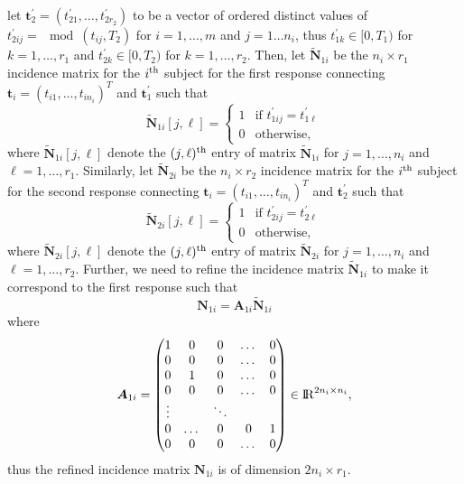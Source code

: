\documentclass[article,lineno]{biometrika}
\begin{document}
 let 
 $
\boldsymbol t_2^\prime = (t_{21}^\prime, \dots, t_{2r_2}^\prime)
 $
 to be a vector of ordered distinct values of $t_{2ij}^\prime =\mod{(t_{ij}, T_2)}$ for $i = 1, \dots, m$ and $j = 1\dots n_i$, 
 thus $t_{1k}^\prime \in [0, T_1)$ for $k = 1, \dots, r_1$ and
  $t_{2k}^\prime \in [0, T_2)$ for $k = 1, \dots, r_2$.
Then, let 
 $\boldsymbol {\tilde N}_{1i}$ be the $n_i \times r_1$ incidence matrix for the $i^{\rm th}$ subject 
 for the first response connecting 
 $
 \boldsymbol t_i = (t_{i1}, \dots, t_{in_i})^T 
 $
 and
 $\boldsymbol t^\prime_1$ such that
 $$
\boldsymbol {\tilde N}_{1i} [j, \ell] =
\begin{cases}
1 & \text{if } t_{1ij}^\prime = t_{1\ell}^\prime \\
0 & \text{otherwise},
\end{cases}
$$
where 
$\boldsymbol {\tilde N}_{1i} [j, \ell]$ denote the $(j, \ell)^{\rm th}$ entry of matrix 
$\boldsymbol {\tilde N}_{1i}$ for $j = 1, \dots, n_i$ and $\ell = 1, \dots, r_1$. 
Similarly, 
let 
 $\boldsymbol {\tilde N}_{2i}$ be the $n_i \times r_2$ incidence matrix for the $i^{\rm th}$ subject 
 for the second response connecting 
 $
 \boldsymbol t_i = (t_{i1}, \dots, t_{in_i})^T 
 $
 and
 $\boldsymbol t^\prime_2$ such that
 $$
\boldsymbol {\tilde N}_{2i} [j, \ell] =
\begin{cases}
1 & \text{if } t_{2ij}^\prime = t_{2\ell}^\prime \\
0 & \text{otherwise},
\end{cases}
$$
where 
$\boldsymbol {\tilde N}_{2i} [j, \ell]$ denote the $(j, \ell)^{\rm th}$ entry of matrix 
$\boldsymbol {\tilde N}_{2i}$ for $j = 1, \dots, n_i$ and $\ell = 1, \dots, r_2$. 
Further, we need to refine the incidence matrix $\boldsymbol {\tilde N}_{1i}$ to make it correspond to the first response such that 
$$
\boldsymbol N_{1i} = \boldsymbol A_{1i} \boldsymbol {\tilde N} _{1i}
$$
where 
\[
\boldsymbol A_{1i} =
 \begin{pmatrix}
   1 & 0 & 0 &  \dots & 0 \\
  0 & 0 & 0 &   \dots & 0 \\
  0 & 1 & 0 & \dots & 0 \\
   0 & 0 & 0 &   \dots & 0  \\
  \vdots &  & \ddots &  \\ 
 0 & \dots & 0  & 0 & 1\\
  0 & 0 & 0 &   \dots & 0 \\
 \end{pmatrix}
   \in {\rm I\!R}^{2n_i \times n_i},
 \]
thus the refined incidence matrix $\boldsymbol N_{1i}$ is of dimension $2n_i \times r_1$.
\end{document}
